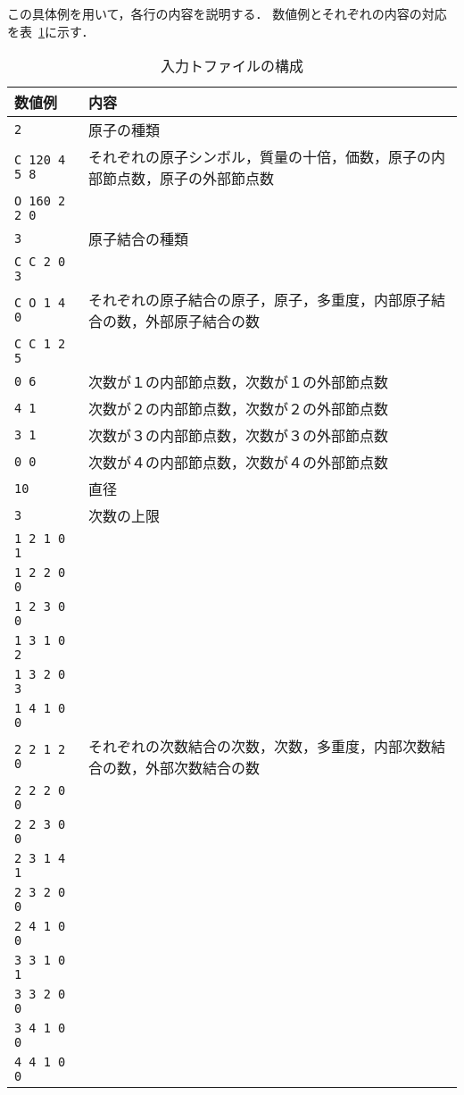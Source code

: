 \documentclass[11pt,titlepage,dvipdfmx,twoside]{jarticle}
\begin{document}
この具体例を用いて，各行の内容を説明する．
数値例とそれぞれの内容の対応を表~\ref{tab:InputFormat}に示す．

\bigskip
\begin{table}[H]
\begin{center} \caption{入力トファイルの構成}
\label{tab:InputFormat}
  \begin{tabular}{l|l}
  数値例 & 内容\\ \hline \hline
{\tt  2} & 原子の種類\\ \hline
{\tt  C 120 4 5 8} & それぞれの原子シンボル，質量の十倍，価数，原子の内部節点数，原子の外部節点数\\
{\tt  O 160 2 2 0} & \\ \hline
{\tt  3} & 原子結合の種類　\\ \hline
{\tt  C C 2 0 3} & \\
{\tt  C O 1 4 0} &  それぞれの原子結合の原子，原子，多重度，内部原子結合の数，外部原子結合の数　\\
{\tt  C C 1 2 5} & \\ \hline
{\tt  0 6} & 次数が１の内部節点数，次数が１の外部節点数　\\ 
{\tt  4 1} & 次数が２の内部節点数，次数が２の外部節点数 \\
{\tt  3 1} & 次数が３の内部節点数，次数が３の外部節点数　\\
{\tt  0 0} & 次数が４の内部節点数，次数が４の外部節点数　\\ \hline
{\tt  10} & 直径　\\ \hline
{\tt  3} & 次数の上限　\\ \hline
{\tt  1 2 1 0 1} & \\
{\tt  1 2 2 0 0} & \\
{\tt  1 2 3 0 0} & \\
{\tt  1 3 1 0 2} & \\
{\tt  1 3 2 0 3} & \\
{\tt  1 4 1 0 0} & \\
{\tt  2 2 1 2 0} & それぞれの次数結合の次数，次数，多重度，内部次数結合の数，外部次数結合の数 \\
{\tt  2 2 2 0 0} & \\
{\tt  2 2 3 0 0} & \\
{\tt  2 3 1 4 1} & \\
{\tt  2 3 2 0 0} & \\
{\tt  2 4 1 0 0} & \\
{\tt  3 3 1 0 1} & \\
{\tt  3 3 2 0 0} & \\
{\tt  3 4 1 0 0} & \\
{\tt  4 4 1 0 0} & \\ \hline
  \end{tabular}
\end{center}
\end{table}
\end{document}
